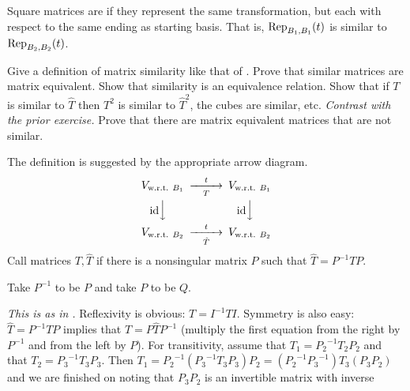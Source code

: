 \begin{exercises}
    Square matrices are  if they represent the same
    transformation, but each with respect to the same ending as starting
    basis.
    That is, \( \rep{t}{B_1,B_1} \) is similar to \( \rep{t}{B_2,B_2} \).
    \begin{exparts}
      \partsitem Give a  definition of matrix similarity like that of
        .
      \partsitem Prove that similar matrices are matrix equivalent.
      \partsitem Show that similarity is an equivalence relation.
      \partsitem Show that if \( T \) is similar to \( \hat{T} \) then
        \( T^2 \) is similar to \( \hat{T}^2 \), the cubes are similar, etc.
        \textit{Contrast with the prior exercise.}
      \partsitem Prove that there are matrix equivalent matrices 
        that are not similar.
    \end{exparts}
    \begin{answer}
      \begin{exparts}
        \partsitem The definition is suggested by the appropriate 
          arrow diagram.
          \begin{equation*}
            \begin{CD}
              V_\wrt{B_1}                   @>t>T>        V_\wrt{B_1}       \\
              @V\scriptstyle\identity VV        @V\scriptstyle\identity VV \\
              V_\wrt{B_2}             @>t>\hat{T}>  V_\wrt{B_2}
            \end{CD}
          \end{equation*}
          Call matrices \( T, \hat{T} \)  if there
          is a nonsingular matrix \( P \) such that
          \( \hat{T}=P^{-1}TP \).
        \item Take \( P^{-1} \) to be \( P \) and take \( P \) to be \( Q \).
        \item \textit{This is as in .}
          Reflexivity is obvious: \( T=I^{-1}TI \).
          Symmetry is also easy: \( \hat{T}=P^{-1}TP \) implies that 
          \( T=P\hat{T}P^{-1} \) (multiply the first equation from the right
          by $P^{-1}$ and from the left by $P$).
          For transitivity, assume that \( T_1={P_2}^{-1}T_2P_2 \) and that 
          \( T_2={P_3}^{-1}T_3P_3 \).
          Then \( T_1={P_2}^{-1}({P_3}^{-1}T_3P_3)P_2
                     =({P_2}^{-1}{P_3}^{-1})T_3(P_3P_2) \) and we are finished
          on noting that \( P_3P_2 \) is an invertible matrix with inverse

\end{exparts}
\end{answer}
\end{exercises}
